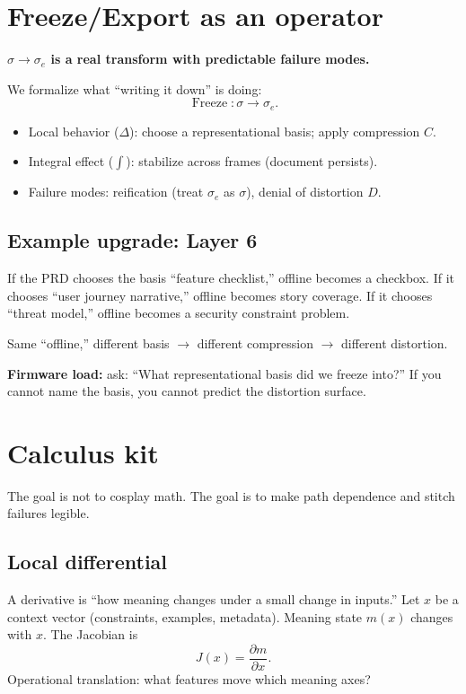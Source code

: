 \documentclass[11pt]{article}
\begin{document}
\section{Freeze/Export as an operator}

\textbf{$\sigma \rightarrow \sigma_e$ is a real transform with predictable failure modes.}

We formalize what ``writing it down'' is doing:
\[
  \operatorname{Freeze}:\sigma \rightarrow \sigma_e.
\]

\begin{itemize}[leftmargin=2em]
  \item Local behavior ($\Delta$): choose a representational basis; apply compression $C$.
  \item Integral effect ($\int$): stabilize across frames (document persists).
  \item Failure modes: reification (treat $\sigma_e$ as $\sigma$), denial of distortion $D$.
\end{itemize}

\subsection{Example upgrade: Layer 6}

If the PRD chooses the basis ``feature checklist,'' offline becomes a checkbox. If it chooses ``user journey narrative,'' offline becomes story coverage. If it chooses ``threat model,'' offline becomes a security constraint problem.

Same ``offline,'' different basis $\rightarrow$ different compression $\rightarrow$ different distortion.

\textbf{Firmware load:} ask: ``What representational basis did we freeze into?'' If you cannot name the basis, you cannot predict the distortion surface.

\section{Calculus kit}

The goal is not to cosplay math. The goal is to make path dependence and stitch failures legible.

\subsection{Local differential}

A derivative is ``how meaning changes under a small change in inputs.'' Let $x$ be a context vector (constraints, examples, metadata). Meaning state $m(x)$ changes with $x$. The Jacobian is
\[
  J(x)=\frac{\partial m}{\partial x}.
\]
Operational translation: what features move which meaning axes?
\end{document}
